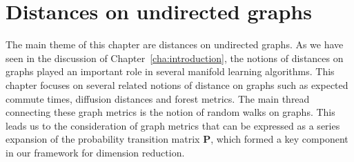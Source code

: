 \chapter{Distances on undirected graphs}
\label{cha:dist-undir-graphs}
The main theme of this chapter are distances on undirected graphs. As
we have seen in the discussion of Chapter~\ref{cha:introduction}, the
notions of distances on graphs played an important role in several
manifold learning algorithms. This chapter focuses on several related
notions of distance on graphs such as expected commute times, diffusion
distances and forest metrics. The main thread connecting these graph
metrics is the notion of random walks on graphs. This leads us to the
consideration of graph metrics that can be expressed as a series
expansion of the probability transition matrix $\mathbf{P}$, which
formed a key component in our framework for dimension reduction.
